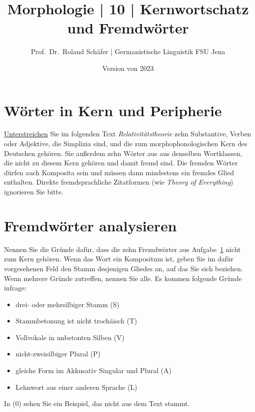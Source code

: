 \documentclass[12pt,a4paper,twoside]{article}
\author{Prof.\ Dr.\ Roland Schäfer | Germanistische Linguistik FSU Jena}
\title{Morphologie | 10 | Kernwortschatz und Fremdwörter}
\date{Version von 2023}
\newcommand{\Zeile}{\vspace{\baselineskip}}
\newcommand*{\mybox}[1]{\framebox{#1}}
\newcommand{\Lf}{
  \setlength{\itemsep}{1pt}
  \setlength{\parskip}{0pt}
  \setlength{\parsep}{0pt}
}
\begin{document}
\maketitle

\Zeile

\section{Wörter in Kern und Peripherie}\label{sec:woerter}

\ul{Unterstreichen} Sie im folgenden Text \textit{Relativitätstheorie} zehn Substantive, Verben oder Adjektive, die Simplizia sind, und die zum morphophonologischen Kern des Deutschen gehören.
\mybox{Umrahmen} Sie außerdem zehn Wörter aus aus denselben Wortklassen, die nicht zu diesem Kern gehören und damit fremd sind.
Die fremden Wörter dürfen auch Komposita sein und müssen dann mindestens ein fremdes Glied enthalten.
Direkte fremdsprachliche Zitatformen (wie \textit{Theory of Everything}) ignorieren Sie bitte.

\section{Fremdwörter analysieren}\label{sec:analyse}

Nennen Sie die Gründe dafür, dass die zehn Fremdwörter aus Aufgabe~\ref{sec:woerter} nicht zum Kern gehören.
Wenn das Wort ein Kompositum ist, geben Sie im dafür vorgesehenen Feld den Stamm desjenigen Gliedes an, auf das Sie sich beziehen.
Wenn mehrere Gründe zutreffen, nennen Sie alle.
Es kommen folgende Gründe infrage:

\begin{itemize}\Lf
  \item drei- oder mehrsilbiger Stamm (S)
  \item Stammbetonung ist nicht trochäisch (T)
  \item Vollvokale in unbetonten Silben (V)
  \item nicht-zweisilbiger Plural (P)
  \item gleiche Form im Akkusativ Singular und Plural (A)
  \item Lehnwort aus einer anderen Sprache (L)
\end{itemize}

In (0) sehen Sie ein Beispiel, das nicht aus dem Text stammt.
\end{document}
